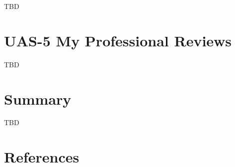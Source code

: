 \documentclass[
  letterpaper,
  DIV=11,
  numbers=noendperiod]{scrreprt}
\begin{document}
TBD


\chapter{UAS-5 My Professional
Reviews}\label{uas-5-my-professional-reviews}

TBD


\chapter{Summary}\label{summary}

TBD


\chapter*{References}\label{references}


\label{refs}
\end{document}
